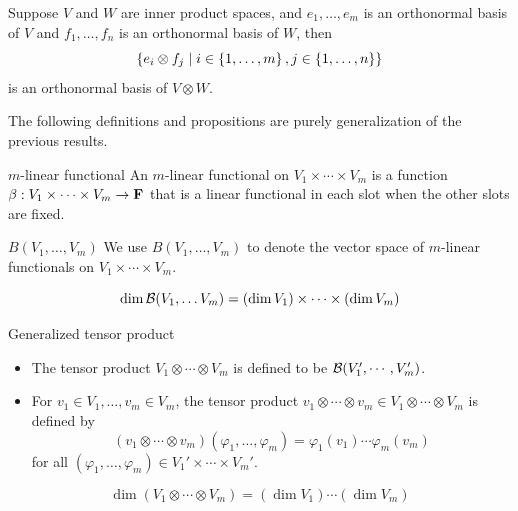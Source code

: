 \documentclass[12pt,a4paper]{article}
\begin{document}
    \begin{prop}
        Suppose $V$ and $W$ are inner product spaces, and $e_1,\dots,e_m$ is an orthonormal basis of $V$ and $f_1,\dots,f_n$ is an orthonormal basis of $W$, then
        $$
        \left\{e_i\otimes f_j\mid i\in\left\{1,\dots,m\right\},j\in\left\{1,\dots,n\right\}\right\}
        $$
        is an orthonormal basis of $V\otimes W$.
    \end{prop}
    \hfill

    \begin{remark}
        The following definitions and propositions are purely generalization of the previous results.
    \end{remark}
    \hfill

    \begin{defi}{$m$-linear functional}
        An $m$-linear functional on $V_1\times\cdots\times V_m$ is a function $\beta:V_1\times\cdots\times V_m\to\mathbf{F}$ that is a linear functional in each slot when the other slots are fixed.
    \end{defi}
    \begin{notation}{$B(V_1,\dots,V_m)$}
        We use $B(V_1,\dots,V_m)$ to denote the vector space of $m$-linear functionals on $V_1\times\cdots\times V_m$. 
    \end{notation}
    \hfill

    \begin{prop}
        $$
        \dim \mathcal{B}(V_1,\dots V_m)=(\dim V_1)\times\cdots\times(\dim V_m)
        $$
    \end{prop}
    \hfill

    \begin{defi}{Generalized tensor product}
        \begin{itemize}
            \item The tensor product $V_1\otimes\cdots\otimes V_m$ is defined to be $\mathcal{B}(V_1',\cdots,V_m')$.
            \item For $v_1\in V_1,\dots,v_m\in V_m$, the tensor product $v_1\otimes\cdots\otimes v_m\in V_1\otimes\cdots\otimes V_m$ is defined by
            $$
            (v_1\otimes\cdots\otimes v_m)(\varphi_1,\dots,\varphi_m)=\varphi_1(v_1)\cdots\varphi_m(v_m)
            $$
            for all $(\varphi_1,\dots,\varphi_m)\in V_1'\times\cdots\times V_m'$.
        \end{itemize}
    \end{defi}
    \hfill

    \begin{prop}
        $$
        \dim(V_1\otimes\cdots\otimes V_m)=(\dim V_1)\cdots(\dim V_m)
        $$
    \end{prop}
    \hfill
\end{document}
